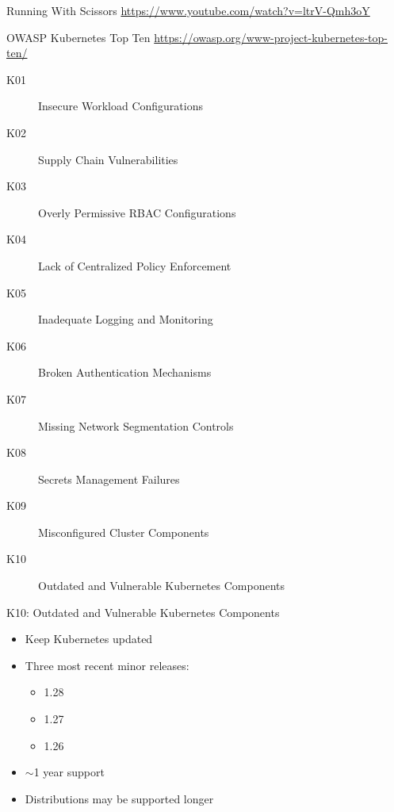 \documentclass{dcpresentation}
\begin{document}

\begin{frame}{Running With Scissors}
  \url{https://www.youtube.com/watch?v=ltrV-Qmh3oY}
\end{frame}


\begin{frame}{OWASP Kubernetes Top Ten}
  {\url{https://owasp.org/www-project-kubernetes-top-ten/}}
  \begin{description}
  \item[K01] Insecure Workload Configurations
  \item[K02] Supply Chain Vulnerabilities
  \item[K03] Overly Permissive RBAC Configurations
  \item[K04] Lack of Centralized Policy Enforcement
  \item[K05] Inadequate Logging and Monitoring
  \item[K06] Broken Authentication Mechanisms
  \item[K07] Missing Network Segmentation Controls
  \item[K08] Secrets Management Failures
  \item[K09] Misconfigured Cluster Components
  \item[K10] Outdated and Vulnerable Kubernetes Components
  \end{description}
\end{frame}

\begin{frame}{K10: Outdated and Vulnerable Kubernetes Components}
  \begin{itemize}
  \item Keep Kubernetes updated
  \item Three most recent minor releases:
    \begin{itemize}
    \item 1.28
    \item 1.27
    \item 1.26
    \end{itemize}
  \item $\sim$1 year support
  \item Distributions may be supported longer
  \end{itemize}
\end{frame}
\end{document}
